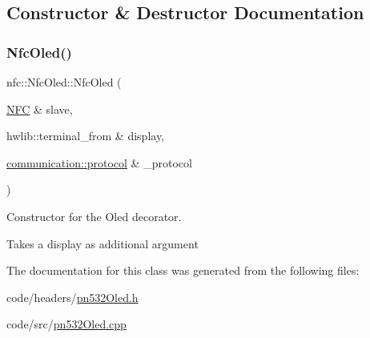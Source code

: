 \subsection{Constructor \& Destructor Documentation}
\mbox{\label{classnfc_1_1NfcOled_ab3917823345cbb6bc0881fa04d84a6cb}} 
\subsubsection{\texorpdfstring{Nfc\+Oled()}{NfcOled()}}
{\footnotesize\ttfamily nfc\+::\+Nfc\+Oled\+::\+Nfc\+Oled (\begin{DoxyParamCaption}\item[{\hyperlink{classnfc_1_1NFC}{N\+FC} \&}]{slave,  }\item[{hwlib\+::terminal\+\_\+from \&}]{display,  }\item[{\hyperlink{classcommunication_1_1protocol}{communication\+::protocol} \&}]{\+\_\+protocol }\end{DoxyParamCaption})}



Constructor for the Oled decorator. 

Takes a display as additional argument 

The documentation for this class was generated from the following files\+:\begin{DoxyCompactItemize}
\item 
code/headers/\hyperlink{pn532Oled_8h}{pn532\+Oled.\+h}\item 
code/src/\hyperlink{pn532Oled_8cpp}{pn532\+Oled.\+cpp}\end{DoxyCompactItemize}
